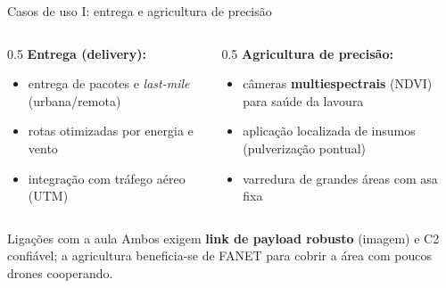 \documentclass[aspectratio=169,11pt]{beamer}
\begin{document}
\begin{frame}{Casos de uso I: entrega e agricultura de precisão}
  \begin{columns}
    \begin{column}{0.5\textwidth}
      \textbf{Entrega (delivery):}
      \begin{itemize}
        \item entrega de pacotes e \emph{last-mile} (urbana/remota)
        \item rotas otimizadas por energia e vento
        \item integração com tráfego aéreo (UTM)
      \end{itemize}
    \end{column}
    \begin{column}{0.5\textwidth}
      \textbf{Agricultura de precisão:}
      \begin{itemize}
        \item câmeras \textbf{multiespectrais} (NDVI) para saúde da lavoura
        \item aplicação localizada de insumos (pulverização pontual)
        \item varredura de grandes áreas com asa fixa
      \end{itemize}
    \end{column}
  \end{columns}
  \begin{exampleblock}{Ligações com a aula}
    Ambos exigem \textbf{link de payload robusto} (imagem) e C2 confiável; a agricultura beneficia-se de FANET para cobrir a área com poucos drones cooperando.
  \end{exampleblock}
\end{frame}
\end{document}
